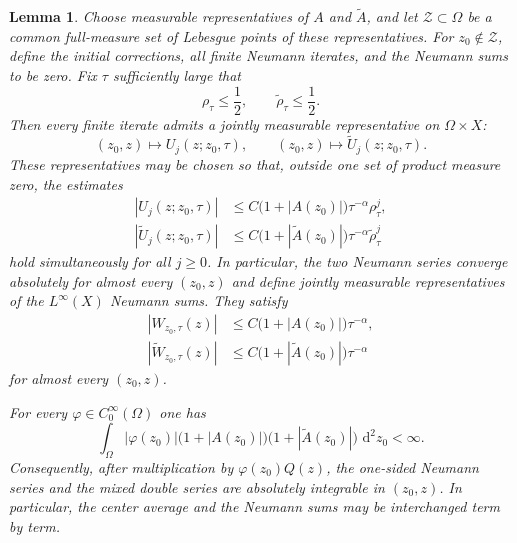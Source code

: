 \documentclass[a4paper,11pt]{article}
\newcommand{\dd}{\,\text{d}}
\theoremstyle{plain}
\newtheorem{lem}[thm]{Lemma}
\theoremstyle{definition}
\theoremstyle{remark}
\begin{document}
\begin{lem}\label{lem-center-measurability}
Choose measurable representatives of $A$ and $\widetilde A$, and let
$\mathcal Z\subset\Omega$ be a common full-measure set of Lebesgue points of these
representatives.  For $z_0\notin\mathcal Z$, define the initial corrections, all finite
Neumann iterates, and the Neumann sums to be zero.  Fix $\tau$ sufficiently
large that
\begin{equation*}
        \rho_\tau\leq\frac12,
        \qquad
        \widetilde\rho_\tau\leq\frac12.
\end{equation*}
Then every finite iterate admits a jointly measurable representative on
$\Omega\times X$:
\begin{equation*}
        (z_0,z)\longmapsto U_j(z;z_0,\tau),
        \qquad
        (z_0,z)\longmapsto \widetilde U_j(z;z_0,\tau).
\end{equation*}
These representatives may be chosen so that, outside one set of product
measure zero, the estimates
\begin{align}
 |U_j(z;z_0,\tau)|
 &\leq C\bigl(1+|A(z_0)|\bigr)\tau^{-\alpha}\rho_\tau^j,
                                                        \label{Uj-pointwise-majorant}\\
 |\widetilde U_j(z;z_0,\tau)|
 &\leq C\bigl(1+|\widetilde A(z_0)|\bigr)
        \tau^{-\alpha}\widetilde\rho_\tau^j             \label{tilde-Uj-pointwise-majorant}
\end{align}
hold simultaneously for all $j\geq0$.  In particular, the two Neumann series
converge absolutely for almost every $(z_0,z)$ and define jointly measurable
representatives of the $L^\infty(X)$ Neumann sums.  They satisfy
\begin{align}
 |W_{z_0,\tau}(z)|
 &\leq C\bigl(1+|A(z_0)|\bigr)\tau^{-\alpha},
                                                        \label{W-pointwise-majorant}\\
 |\widetilde W_{z_0,\tau}(z)|
 &\leq C\bigl(1+|\widetilde A(z_0)|\bigr)\tau^{-\alpha}  \label{tilde-W-pointwise-majorant}
\end{align}
for almost every $(z_0,z)$.

For every $\varphi\in C_0^\infty(\Omega)$ one has
\begin{equation}\label{center-weight-integrability}
        \int_\Omega |\varphi(z_0)|
        \bigl(1+|A(z_0)|\bigr)
        \bigl(1+|\widetilde A(z_0)|\bigr)\,\dd^2z_0<\infty .
\end{equation}
Consequently, after multiplication by $\varphi(z_0)Q(z)$, the one-sided Neumann series and the mixed double series are absolutely integrable in $(z_0,z)$.  In particular, the center average and the Neumann sums may be interchanged term by term.
\end{lem}
\end{document}
